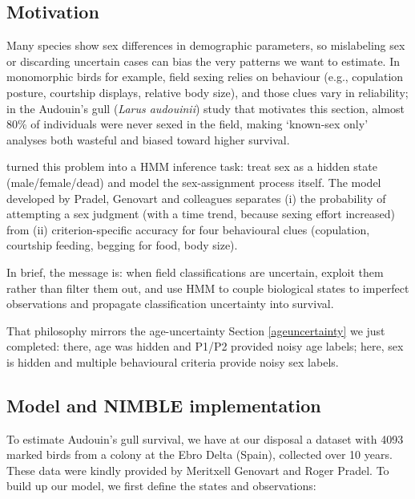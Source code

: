 \documentclass[
  12pt,
]{krantz}
\begin{document}
\subsection{Motivation}\label{motivation-2}

Many species show sex differences in demographic parameters, so mislabeling sex or discarding uncertain cases can bias the very patterns we want to estimate. In monomorphic birds for example, field sexing relies on behaviour (e.g., copulation posture, courtship displays, relative body size), and those clues vary in reliability; in the Audouin's gull (\emph{Larus audouinii}) study that motivates this section, almost 80\% of individuals were never sexed in the field, making `known-sex only' analyses both wasteful and biased toward higher survival.

\citeauthor{pradel2008sex} \citetext{\citeyear{pradel2008sex}; \citealp[see also][]{genovart_exploiting_2012}} turned this problem into a HMM inference task: treat sex as a hidden state (male/female/dead) and model the sex-assignment process itself. The model developed by Pradel, Genovart and colleagues separates (i) the probability of attempting a sex judgment (with a time trend, because sexing effort increased) from (ii) criterion-specific accuracy for four behavioural clues (copulation, courtship feeding, begging for food, body size).

In brief, the message is: when field classifications are uncertain, exploit them rather than filter them out, and use HMM to couple biological states to imperfect observations and propagate classification uncertainty into survival.

That philosophy mirrors the age-uncertainty Section \ref{ageuncertainty} we just completed: there, age was hidden and P1/P2 provided noisy age labels; here, sex is hidden and multiple behavioural criteria provide noisy sex labels.

\subsection{Model and NIMBLE implementation}\label{model-and-nimble-implementation-2}

To estimate Audouin's gull survival, we have at our disposal a dataset with 4093 marked birds from a colony at the Ebro Delta (Spain), collected over 10 years. These data were kindly provided by Meritxell Genovart and Roger Pradel. To build up our model, we first define the states and observations:
\end{document}
